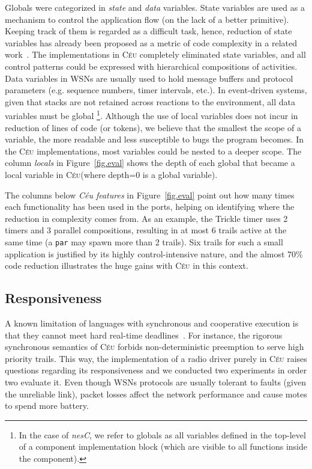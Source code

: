 \documentclass[10pt]{sensys-proc}
\newcommand{\CEU}{\textsc{C\'{e}u}\xspace}
\newcommand{\code}[1] {{\small{\texttt{#1}}}}
\begin{document}
Globals were categorized in \emph{state} and \emph{data} variables.
%
State variables are used as a mechanism to control the application flow (on the 
lack of a better primitive).
Keeping track of them is regarded as a difficult task, hence, reduction of 
state variables has already been proposed as a metric of code complexity in a 
related work~\cite{wsn.protothreads}.
The implementations in \CEU completely eliminated state variables, and all 
control patterns could be expressed with hierarchical compositions of 
activities.
%
Data variables in WSNs are usually used to hold message buffers and protocol 
parameters (e.g. sequence numbers, timer intervals, etc.).
In event-driven systems, given that stacks are not retained across reactions to 
the environment, all data variables must be global%
\footnote{In the case of \emph{nesC}, we refer to globals as all variables 
defined in the top-level of a component implementation block (which are visible 
to all functions inside the component).}.
Although the use of local variables does not incur in reduction of lines of 
code (or tokens), we believe that the smallest the scope of a variable, the 
more readable and less susceptible to bugs the program becomes.
%
In the \CEU implementations, most variables could be nested to a deeper scope.
The column \emph{locals} in Figure~\ref{fig.eval} shows the depth of each 
global that became a local variable in \CEU (where depth=0 is a global 
variable).

The columns below \emph{C\'eu features} in Figure~\ref{fig.eval} point out how 
many times each functionality has been used in the ports, helping on 
identifying where the reduction in complexity comes from.
%
As an example, the Trickle timer uses 2 timers and 3 parallel compositions, 
resulting in at most 6 trails active at the same time (a \code{par} may spawn 
more than 2 trails).
Six trails for such a small application is justified by its highly 
control-intensive nature, and the almost 70\% code reduction illustrates the 
huge gains with \CEU in this context.
%


\subsection{Responsiveness}
\label{sec.eval.radio}

A known limitation of languages with synchronous and cooperative execution is 
that they cannot meet hard real-time 
deadlines~\cite{wsn.comparison,wsn.tosthreads}.
For instance, the rigorous synchronous semantics of \CEU forbids 
non-deterministic preemption to serve high priority trails.
%
This way, the implementation of a radio driver purely in \CEU raises questions
regarding its responsiveness and we conducted two experiments in order two 
evaluate it.
%
Even though WSNs protocols are usually tolerant to faults (given the unreliable 
link), packet losses affect the network performance and cause motes to spend 
more battery.
\end{document}
